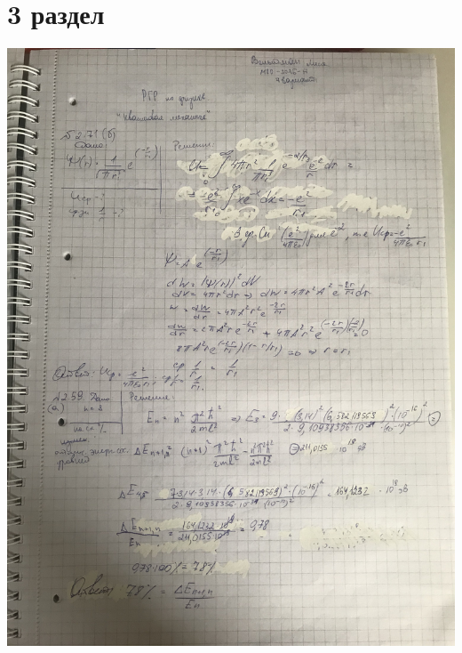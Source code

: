\documentclass[12pt]{article}
\begin{document}
\section{3 раздел}
\begin{center}
\includegraphics[scale=0.18]{3_1.jpeg}\\
\vfill

\end{center}
\end{document}
